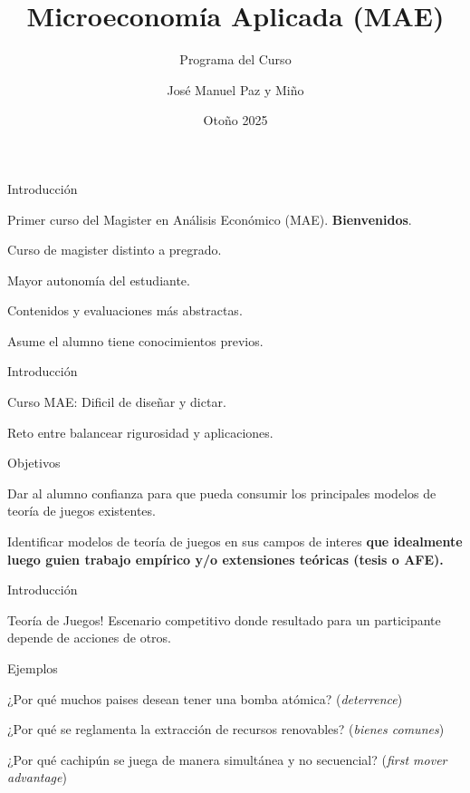 \documentclass[notes, 11pt]{beamer} %
\newenvironment{wideitemize}{\itemize\addtolength{\itemsep}{10pt}}{\enditemize}
\begin{document}
\title{Microeconom\'ia Aplicada (MAE)}   
\subtitle{Programa del Curso}   
\author[Paz y Mino ]{Jos\'e Manuel Paz y Mi\~no}
\date{Oto\~no 2025} 

\frame{\titlepage} 

\begin{frame}{Introducci\'on}
	\begin{wideitemize}
		\item<1-> Primer curso del Magister en An\'alisis Econ\'omico (MAE). \textbf{Bienvenidos}.
		\item<2-> Curso de magister distinto a pregrado.
		\begin{wideitemize}
			\item<3->[--] Mayor autonom\'ia del estudiante.
			\item<4->[--] Contenidos y evaluaciones m\'as abstractas.
			\item<5->[--] Asume el alumno tiene conocimientos previos.
		\end{wideitemize}
	\end{wideitemize}
\end{frame}

\begin{frame}{Introducci\'on}
	\begin{wideitemize}
		\item<1-> Curso MAE: Dificil de dise\~nar y dictar.
		\item<2-> Reto entre balancear rigurosidad y aplicaciones.
		\item<3-> Objetivos
		\begin{wideitemize}
			\item<4->[--] Dar al alumno confianza para que pueda consumir los principales modelos de teor\'ia de juegos existentes.
			\item<5->[--] Identificar modelos de teor\'ia de juegos en sus campos de interes \textbf{que idealmente luego guien trabajo emp\'irico y/o extensiones te\'oricas (tesis o AFE).}
		\end{wideitemize}
	\end{wideitemize}
\end{frame}

\iffalse
\begin{frame}{Introducci\'on}
	\begin{wideitemize}
		\item<1-> Teor\'ia de Juegos! Escenario competitivo donde resultado para un participante depende de acciones de otros.
		\item<2-> Ejemplos
		\begin{wideitemize}
			\item<3->[--] ¿Por qu\'e muchos paises desean tener una bomba at\'omica? (\textit{deterrence})
			\item<4->[--] ¿Por qu\'e se reglamenta la extracci\'on de recursos renovables? (\textit{bienes comunes})
			\item<5->[--] ¿Por qu\'e cachip\'un se juega de manera simult\'anea y no secuencial? (\textit{first mover advantage})
		\end{wideitemize}
	\end{wideitemize}
\end{frame}
\end{document}
